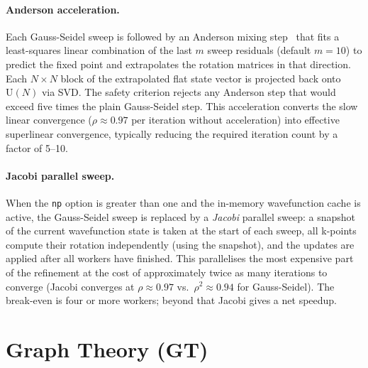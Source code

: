 \documentclass[a4paper,12pt]{report}
\begin{document}
\paragraph{Anderson acceleration.}
Each Gauss-Seidel sweep is followed by an Anderson mixing
step~\cite{Walker2011} that fits a least-squares linear combination of the
last $m$ sweep residuals (default $m = 10$) to predict the fixed point and
extrapolates the rotation matrices in that direction.
Each $N \times N$ block of the extrapolated flat state vector is
projected back onto $\mathrm{U}(N)$ via SVD\@.
The safety criterion rejects any Anderson step that would exceed five
times the plain Gauss-Seidel step.
This acceleration converts the slow linear convergence ($\rho \approx 0.97$
per iteration without acceleration) into effective superlinear convergence,
typically reducing the required iteration count by a factor of 5--10.

\paragraph{Jacobi parallel sweep.}
When the \texttt{np} option is greater than one and the in-memory
wavefunction cache is active, the Gauss-Seidel sweep is replaced by a
\emph{Jacobi} parallel sweep: a snapshot of the current wavefunction state
is taken at the start of each sweep, all k-points compute their rotation
independently (using the snapshot), and the updates are applied after all
workers have finished.
This parallelises the most expensive part of the refinement at the cost of
approximately twice as many iterations to converge (Jacobi converges at
$\rho \approx 0.97$ vs.\ $\rho^2 \approx 0.94$ for Gauss-Seidel).
The break-even is four or more workers; beyond that Jacobi gives a net
speedup.



























\section{Graph Theory (GT)}
\end{document}

